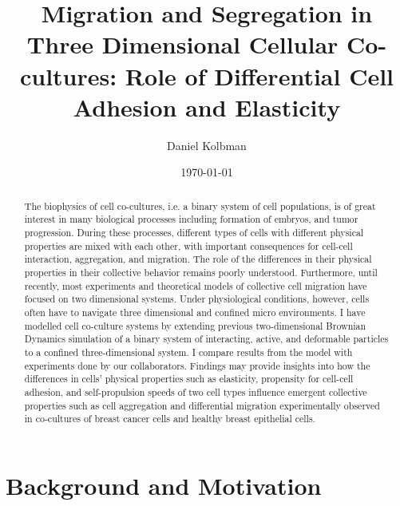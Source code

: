 \documentclass[aps,prb,twocolumn,groupedaddress,nofootinbib,floatfix]{revtex4}
\begin{document}
%
\title{Migration and Segregation in Three Dimensional Cellular Co-cultures: Role of
Differential Cell Adhesion and Elasticity}

%
\author{Daniel Kolbman}
%
%
%

\date{\today}

\begin{abstract} \noindent The biophysics of cell co-cultures, i.e. a binary system of cell populations, is of great interest in many biological processes including formation of embryos, and tumor progression. 
During these processes, different types of cells with different physical properties are mixed with each other, with important consequences for cell-cell interaction, aggregation, and migration. The role of the differences
in their physical properties in their collective behavior remains poorly understood. Furthermore, until recently, most experiments and theoretical models of collective cell migration have focused on two dimensional systems.
Under physiological conditions, however, cells often have to navigate three dimensional and confined micro environments.
I have modelled cell co-culture systems by extending previous two-dimensional Brownian Dynamics simulation of a binary system of interacting, active, and deformable particles to a confined three-dimensional system. I compare results from the model with experiments done by our collaborators.
Findings may provide insights into how the differences in cells' physical properties such as elasticity, propensity for cell-cell adhesion, and self-propulsion speeds of two cell types influence emergent collective properties such as cell aggregation and differential migration experimentally observed in co-cultures of breast cancer cells and healthy breast epithelial cells.  
\end{abstract}

\maketitle

\section{Background and Motivation}
\end{document}
